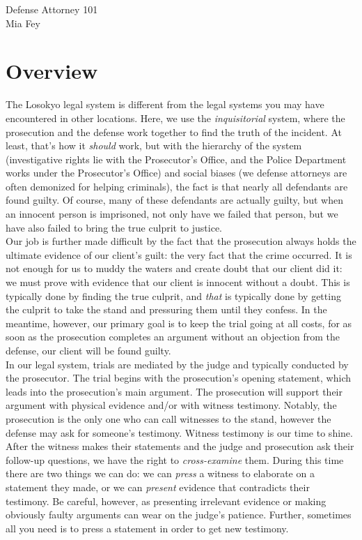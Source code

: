\documentclass{article}
\begin{document}
\begin{center}
Defense Attorney 101\\

Mia Fey
\end{center}

\section{Overview}
The Losokyo legal system is different from the legal systems you may have encountered in other locations. Here, we use the \emph{inquisitorial} system, where the prosecution and the defense work together to find the truth of the incident. At least, that's how it \textit{should} work, but with the hierarchy of the system (investigative rights lie with the Prosecutor's Office, and the Police Department works under the Prosecutor's Office) and social biases (we defense attorneys are often demonized for helping criminals), the fact is that nearly all defendants are found guilty. Of course, many of these defendants are actually guilty, but when an innocent person is imprisoned, not only have we failed that person, but we have also failed to bring the true culprit to justice.\\


Our job is further made difficult by the fact that the prosecution always holds the ultimate evidence of our client's guilt: the very fact that the crime occurred. It is not enough for us to muddy the waters and create doubt that our client did it: we must prove with evidence that our client is innocent without a doubt. This is typically done by finding the true culprit, and \textit{that} is typically done by getting the culprit to take the stand and pressuring them until they confess. In the meantime, however, our primary goal is to keep the trial going at all costs, for as soon as the prosecution completes an argument without an objection from the defense, our client will be found guilty.\\

In our legal system, trials are mediated by the judge and typically conducted by the prosecutor. The trial begins with the prosecution's opening statement, which leads into the prosecution's main argument. The prosecution will support their argument with physical evidence and/or with witness testimony. Notably, the prosecution is the only one who can call witnesses to the stand, however the defense may ask for someone's testimony. Witness testimony is our time to shine. After the witness makes their statements and the judge and prosecution ask their follow-up questions, we have the right to \textit{cross-examine} them. During this time there are two things we can do: we can \textit{press} a witness to elaborate on a statement they made, or we can \textit{present} evidence that contradicts their testimony. Be careful, however, as presenting irrelevant evidence or making obviously faulty arguments can wear on the judge's patience. Further, sometimes all you need is to press a statement in order to get new testimony. \\
\end{document}

